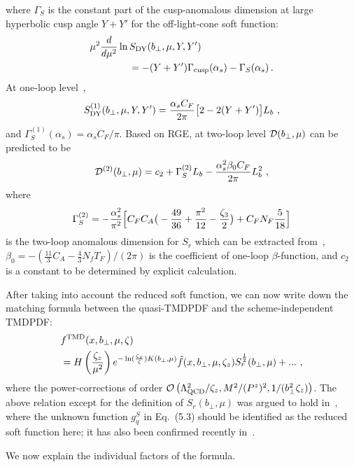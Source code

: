 where $\Gamma_S$ is the constant part of the cusp-anomalous dimension at large hyperbolic cusp angle $Y+Y'$ for the off-light-cone soft function:
\begin{align}
	&\mu^2 \frac{d}{d\mu^2} \ln S_{\rm DY}(b_\perp,\mu,Y,Y')\nonumber \\
	&\qquad\qquad=-(Y+Y')\Gamma_{\rm cusp}(\alpha_s)-\Gamma_S(\alpha_s)\,.
\end{align}
At one-loop level~\cite{Ebert:2019okf},
\begin{align}
	S^{(1)}_{\rm DY}(b_\perp,\mu,Y,Y')=\frac{\alpha_sC_F}{2\pi}\big[2-2(Y+Y')\big]L_b \ ,
\end{align}
and $\Gamma_S^{(1)} (\alpha_s)= \alpha_s C_F/\pi$.
Based on RGE, at two-loop level ${\cal D}(b_\perp,\mu)$ can be predicted to be
\begin{align}
	{\cal D}^{(2)}(b_\perp,\mu)=c_2+\Gamma_S^{(2)}L_b-\frac{\alpha_s^2\beta_0C_F}{2\pi}L_b^2 \ ,
\end{align}
where
\begin{align}
	\Gamma_S^{(2)}=-\frac{\alpha_s^2}{\pi^2}\Big[C_FC_A\big(-\frac{49}{36}+\frac{\pi^2}{12}-\frac{\zeta_3}{2}\big)+C_FN_F\frac{5}{18}\Big]\nonumber
\end{align}
is the two-loop anomalous dimension for $S_r$ which can be extracted from~\cite{Grozin:2015kna}, $\beta_0=-\left(\frac{11}{3}C_A-\frac{4}{3}N_f T_F\right)/(2\pi)$ is the coefficient of one-loop $\beta$-function, and $c_2$ is a constant to be determined by explicit calculation.

After taking into account the reduced soft function, we can now write down
the matching formula between the quasi-TMDPDF and the scheme-independent TMDPDF\cite{Ji:2019ewn}:
\begin{align}\label{eq:quasiTMDmatch}
	&f^{\rm TMD}(x,b_\perp,\mu,\zeta)\\
	&=H\left(\frac{\zeta_z}{\mu^2}\right) e^{-\ln (\frac{\zeta_z}{\zeta})K(b_\perp,\mu)}\tilde f(x,b_\perp,\mu,\zeta_z)S_r^{\frac{1}{2}}(b_\perp,\mu)+...\ ,\nonumber
\end{align}
where the power-corrections of order ${\cal O}\left(\Lambda_{\rm QCD}^2/\zeta_z,M^2/(P^z)^2,1/(b^2_\perp\zeta_z) \right)$.
The above relation except for the definition of $S_r(b_\perp,\mu)$ was argued to hold in~\cite{Ebert:2019okf}, where the unknown function $g_q^S$ in Eq.~(5.3) should be identified as the reduced soft function here; it has also been confirmed recently in~\cite{Vladimirov:2020ofp}.


We now explain the individual factors of the formula.

